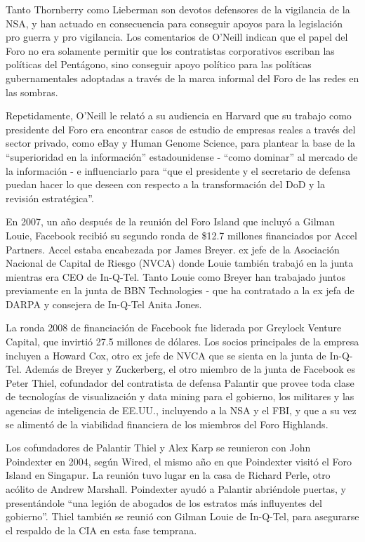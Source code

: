 \documentclass[10pt,a5paper,twoside,spanish,]{book}
\begin{document}
Tanto Thornberry como Lieberman son devotos defensores de la vigilancia
de la NSA, y han actuado en consecuencia para conseguir apoyos para la
legislación pro guerra y pro vigilancia. Los comentarios de O'Neill
indican que el papel del Foro no era solamente permitir que los
contratistas corporativos escriban las políticas del Pentágono, sino
conseguir apoyo político para las políticas gubernamentales adoptadas a
través de la marca informal del Foro de las redes en las sombras.

Repetidamente, O'Neill le relató a su audiencia en Harvard que su
trabajo como presidente del Foro era encontrar casos de estudio de
empresas reales a través del sector privado, como eBay y Human Genome
Science, para plantear la base de la ``superioridad en la información''
estadounidense - ``como dominar'' al mercado de la información - e
influenciarlo para ``que el presidente y el secretario de defensa puedan
hacer lo que deseen con respecto a la transformación del DoD y la
revisión estratégica''.

En 2007, un año después de la reunión del Foro Island que incluyó a
Gilman Louie, Facebook recibió su segundo ronda de \$12.7 millones
financiados por Accel Partners. Accel estaba encabezada por James
Breyer. ex jefe de la Asociación Nacional de Capital de Riesgo (NVCA)
donde Louie también trabajó en la junta mientras era CEO de In-Q-Tel.
Tanto Louie como Breyer han trabajado juntos previamente en la junta de
BBN Technologies - que ha contratado a la ex jefa de DARPA y consejera
de In-Q-Tel Anita Jones.

La ronda 2008 de financiación de Facebook fue liderada por Greylock
Venture Capital, que invirtió 27.5 millones de dólares. Los socios
principales de la empresa incluyen a Howard Cox, otro ex jefe de NVCA
que se sienta en la junta de In-Q-Tel. Además de Breyer y Zuckerberg, el
otro miembro de la junta de Facebook es Peter Thiel, cofundador del
contratista de defensa Palantir que provee toda clase de tecnologías de
visualización y data mining para el gobierno, los militares y las
agencias de inteligencia de EE.UU., incluyendo a la NSA y el FBI, y que
a su vez se alimentó de la viabilidad financiera de los miembros del
Foro Highlands.

Los cofundadores de Palantir Thiel y Alex Karp se reunieron con John
Poindexter en 2004, según Wired, el mismo año en que Poindexter visitó
el Foro Island en Singapur. La reunión tuvo lugar en la casa de Richard
Perle, otro acólito de Andrew Marshall. Poindexter ayudó a Palantir
abriéndole puertas, y presentándole ``una legión de abogados de los
estratos más influyentes del gobierno''. Thiel también se reunió con
Gilman Louie de In-Q-Tel, para asegurarse el respaldo de la CIA en esta
fase temprana.
\end{document}
